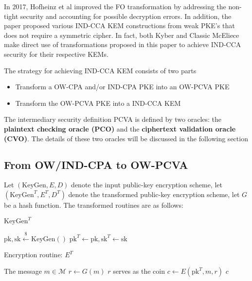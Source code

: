 \documentclass{article}
\newcommand{\leftsample}{\overset{{\scriptscriptstyle\$}}{\leftarrow}}
\begin{document}
In 2017, Hofheinz et al \cite{hofheinz2017modular} improved the FO transformation by addressing the non-tight security and accounting for possible decryption errors. In addition, the paper proposed various IND-CCA KEM constructions from weak PKE's that does not require a symmetric cipher. In fact, both Kyber \cite{avanzi2019crystals} and Classic McEliece \cite{albrecht2022classic} make direct use of transformations proposed in this paper to achieve IND-CCA security for their respective KEMs.

The strategy for achieving IND-CCA KEM consists of two parts

\begin{itemize}
    \item Transform a OW-CPA and/or IND-CPA PKE into an OW-PCVA PKE
    \item Transform the OW-PCVA PKE into a IND-CCA KEM
\end{itemize}

The intermediary security definition PCVA is defined by two oracles: the \textbf{plaintext checking oracle (PCO)} and the \textbf{ciphertext validation oracle (CVO)}. The details of these two oracles will be discussed in the following section

\subsection{From OW/IND-CPA to OW-PCVA}
Let $(\text{KeyGen}, E, D)$ denote the input public-key encryption scheme, let $(\text{KeyGen}^T, E^T, D^T)$ denote the transformed public-key encryption scheme, let $G$ be a hash function. The transformed routines are as follows:

\begin{algorithm}
    \caption[keygen-t]{$\text{KeyGen}^T$}
    \begin{algorithmic}[1]
        \State $\text{pk}, \text{sk} \leftsample \text{KeyGen}()$
        \State \Return $\text{pk}^T \leftarrow \text{pk}, \text{sk}^T \leftarrow \text{sk}$
    \end{algorithmic}
\end{algorithm}

\begin{algorithm}
    \caption[encrypt-t]{Encryption routine: $E^T$}
    \begin{algorithmic}[1]
        \Require The message $m \in \mathcal{M}$
        \State $r \leftarrow G(m)$ \Comment $r$ serves as the coin
        \State $c \leftarrow E(\text{pk}^T, m, r)$
        \State \Return $c$
    \end{algorithmic}
\end{algorithm}
\end{document}
